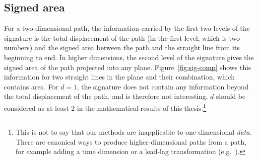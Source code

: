 \subsection{Signed area}
\label{sec:signedArea}
For a two-dimensional path, the information carried by the first two levels of the signature is the total displacement of the path (in the first level, which is two numbers) and the signed area between the path and the straight line from its beginning to end. %
In higher dimensions, the second level of the signature gives the signed area of the path projected into any plane.
Figure~\ref{fig:sig-comp} shows this information for two straight lines in the plane and their combination, which contains area. 
For $d=1$, the signature does not contain any information beyond the total displacement of the path, and is therefore not interesting. 
$d$ should be considered as at least 2 in the mathematical results of this thesis.\footnote{This is not to say that our methods are inapplicable to one-dimensional \emph{data}. There are canonical ways to produce higher-dimensional paths from a path, for example adding a time dimension or a lead-lag transformation (e.g.~\cite{OxSigIntro}).}
